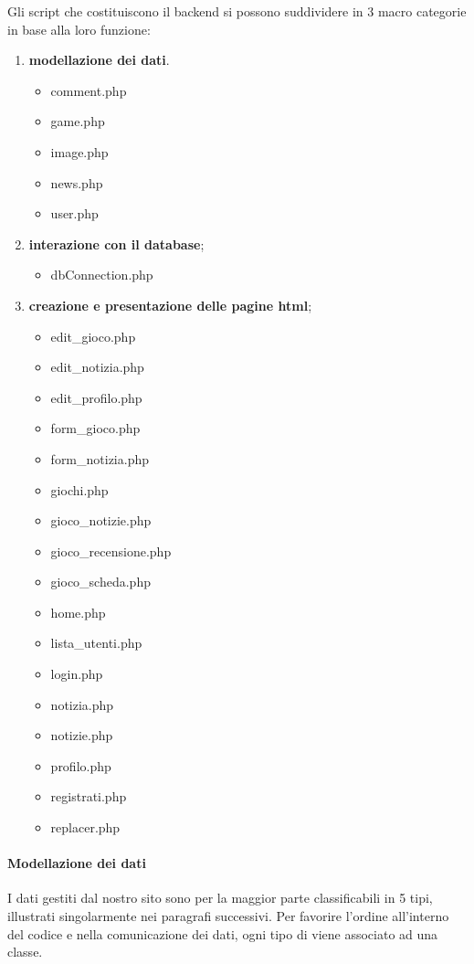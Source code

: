 Gli script che costituiscono il backend si possono suddividere in 3 macro categorie in base alla loro funzione:
\begin{enumerate}
	\item \textbf{modellazione dei dati}.
	\begin{itemize}
		\item comment.php
		\item game.php
		\item image.php
		\item news.php
		\item user.php
	\end{itemize}
	\item \textbf{interazione con il database};
	\begin{itemize}
		\item dbConnection.php
	\end{itemize}
	\item \textbf{creazione e presentazione delle pagine html};
	\begin{itemize}
		\item edit\_gioco.php
		\item edit\_notizia.php
		\item edit\_profilo.php
		\item form\_gioco.php
		\item form\_notizia.php
		\item giochi.php
		\item gioco\_notizie.php
		\item gioco\_recensione.php
		\item gioco\_scheda.php
		\item home.php
		\item lista\_utenti.php
		\item login.php
		\item notizia.php
		\item notizie.php
		\item profilo.php
		\item registrati.php
		\item replacer.php
	\end{itemize}
\end{enumerate}
\paragraph{Modellazione dei dati}
I dati gestiti dal nostro sito sono per la maggior parte classificabili in 5 tipi, illustrati singolarmente nei paragrafi successivi. Per favorire l'ordine all'interno del codice e nella comunicazione dei dati, ogni tipo di viene associato ad una classe.

